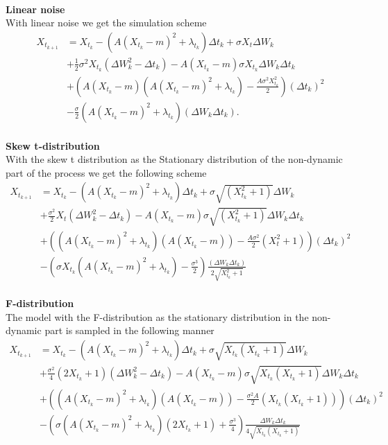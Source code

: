 \\
\textbf{Linear noise}\\
With linear noise we get the simulation scheme
\begin{align}
    X_{t_{k + 1}} &= X_{t_k} - \left(A(X_{t_k} - m)^2 + \lambda_{t_k}\right) \Delta t_k + \sigma X_t \Delta W_{k} \nonumber \\ &
    + \frac{1}{2}\sigma^2 X_{t_k}\left(\Delta W_{k}^2 - \Delta t_k\right) -A(X_{t_k} - m)\sigma X_{t_k} \Delta W_k\Delta t_k \nonumber\\
    & + \left(A\left(X_{t_k} - m\right)\left(A\left(X_{t_k} - m\right)^2 + \lambda_{t_k}\right) - \frac{A\sigma^2X_{t_k}^2}{2}\right)(\Delta t_k)^2 \nonumber \\
    &- \frac{\sigma}{2}\left(A\left(X_{t_k} - m\right)^2 + \lambda_{t_k}\right)\left(\Delta W_{k}\Delta t_k\right).
\end{align}
\\
\textbf{Skew t-distribution}\\
With the skew t distribution as the Stationary distribution of the non-dynamic part of the process we get the following scheme
\begin{align}
    X_{t_{k + 1}} &= X_{t_k} - \left(A(X_{t_k} - m)^2 + \lambda_{t_k}\right) \Delta t_k + \sigma \sqrt{\left(X_{t_k}^2 + 1\right)} \Delta W_{k} \nonumber\\
    &+ \frac{\sigma^2}{2}X_t \left(\Delta W_{k}^2 - \Delta t_k\right) - A\left(X_{t_k} - m \right)\sigma\sqrt{\left(X_{t_k}^2 + 1\right)}\Delta W_{k}\Delta t_k \nonumber\\
    &+ \left(\left(A\left(X_{t_k} - m \right)^2+\lambda_{t_k}\right)\left(A\left(X_{t_k} - m \right)\right) - \frac{A\sigma^2}{2}\left(X_t^2 + 1\right)\right)\left(\Delta t_k\right)^2 \nonumber\\
    &-\left(\sigma X_{t_k}\left(A\left(X_{t_k} - m \right)^2 + \lambda_{t_k}\right) - \frac{\sigma^3}{2}\right)\frac{\left(\Delta W_{k}\Delta t_k\right)}{2\sqrt{X_{t_k}^2 + 1}}
\end{align}
\\
\textbf{F-distribution}\\
The model with the F-distribution as the stationary distribution in the non-dynamic part is sampled in the following manner
\begin{align}
    X_{t_{k + 1}} &= X_{t_k} - \left(A(X_{t_k} - m)^2 + \lambda_{t_k}\right) \Delta t_k + \sigma\sqrt{X_{t_k}\left(X_{t_k} + 1\right)}\Delta W_k \nonumber \\
    &+ \frac{\sigma^2}{4}\left(2X_{t_k} + 1\right)\left(\Delta W_k^2 - \Delta t_k\right) - A \left(X_{t_k} - m\right)\sigma \sqrt{X_{t_k}\left(X_{t_k} + 1\right)}\Delta W_k \Delta t_k \nonumber \\
    &+ \left(\left(A\left(X_{t_k} - m\right)^2 + \lambda_{t_k}\right)\left(A\left(X_{t_k} - m\right)\right) - \frac{\sigma^2A}{2}\left(X_{t_k}\left(X_{t_k} + 1\right)\right)  \right)\left(\Delta t_k\right)^2 \nonumber \\
    &- \left(\sigma\left(A\left(X_{t_k} - m\right)^2 + \lambda_{t_k}\right)\left(2 X_{t_k} + 1\right) + \frac{\sigma^3}{4}\right)\frac{\Delta W_k \Delta t_k}{4\sqrt{X_{t_k}\left(X_{t_k} + 1\right)}}
\end{align}
